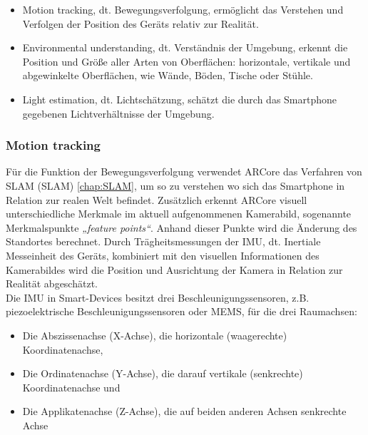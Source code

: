 \begin{itemize}
    \item Motion tracking, dt. Bewegungsverfolgung, ermöglicht das Verstehen und Verfolgen der Position des Geräts relativ zur Realität.
    \item Environmental understanding, dt. Verständnis der Umgebung, erkennt die Position und Größe aller Arten von Oberflächen: horizontale, 
    vertikale und abgewinkelte Oberflächen, wie Wände, Böden, Tische oder Stühle.
    \item Light estimation, dt. Lichtschätzung, schätzt die durch das Smartphone gegebenen Lichtverhältnisse der Umgebung. \cite{arcorefundamentals.2018m}
\end{itemize}
\subsubsection*{Motion tracking}
Für die Funktion der Bewegungsverfolgung verwendet ARCore das Verfahren von \acl{SLAM} (\acs{SLAM}) \ref{chap:SLAM}, um so zu verstehen wo 
sich das Smartphone in Relation zur realen Welt befindet. Zusätzlich erkennt ARCore visuell unterschiedliche Merkmale im aktuell aufgenommenen 
Kamerabild, sogenannte Merkmalspunkte \textit{„feature points“}. Anhand dieser Punkte wird die Änderung des Standortes berechnet. Durch Trägheitsmessungen 
der \ac{IMU}, dt. Inertiale Messeinheit des Geräts, kombiniert mit den visuellen Informationen des Kamerabildes wird die Position und 
Ausrichtung der Kamera in Relation zur Realität abgeschätzt. \cite{arcoreofficial.2020j}
\\
\linebreak 
Die \acl{IMU} in Smart-Devices besitzt drei Beschleunigungssensoren, z.B. piezoelektrische Beschleunigungssensoren oder \ac{MEMS}, für die 
drei Raumachsen:
\begin{itemize}
    \item Die Abszissenachse (X-Achse), die horizontale (waagerechte) Koordinatenachse,
    \item Die Ordinatenachse (Y-Achse), die darauf vertikale (senkrechte) Koordinatenachse und
    \item Die Applikatenachse (Z-Achse), die auf beiden anderen Achsen senkrechte Achse \cite{koordinatennorm.1973m}
\end{itemize}
